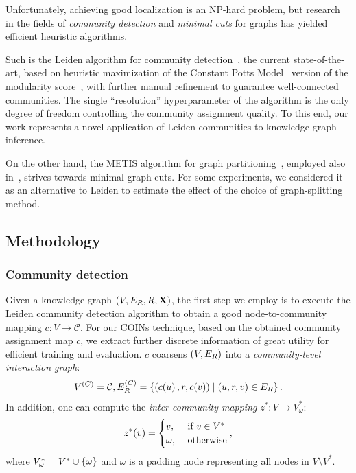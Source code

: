 Unfortunately, achieving good localization is an NP-hard problem, but research in the fields of \emph{community detection} and \emph{minimal cuts} for graphs has yielded efficient heuristic algorithms. 

Such is the Leiden algorithm for community detection~\cite{traag_louvain_2019}, the current state-of-the-art, based on heuristic maximization of the Constant Potts Model~\cite{traag_narrow_2011} version of the modularity score~\cite{blondel_fast_2008}, with further manual refinement to guarantee well-connected communities. The single \enquote{resolution} hyperparameter of the algorithm is the only degree of freedom controlling the community assignment quality. To this end, our work represents a novel application of Leiden communities to knowledge graph inference. 

On the other hand, the METIS algorithm for graph partitioning~\cite{karypis_fast_1998}, employed also in~\cite{zheng_dgl-ke_2020}, strives towards minimal graph cuts. For some experiments, we considered it as an alternative to Leiden to estimate the effect of the choice of graph-splitting method.

\subsection{Methodology}
\label{sec:methodology}

\subsubsection{Community detection}

Given a knowledge graph $\mathopen{}\left(V, E_R, R, \mathbf{X}\right)$, the first step we employ is to execute the Leiden community detection algorithm to obtain a good node-to-community mapping $c: V \to \mathcal{C}$. For our COINs technique, based on the obtained community assignment map $c$, we extract further discrete information of great utility for efficient training and evaluation. $c$ coarsens $\mathopen{}\left(V, E_R\right)$ into a \emph{community-level interaction graph}: 
\begin{equation}
V^{\mathopen{}\left(C\right)} = \mathcal{C}, E^{\mathopen{}\left(C\right)}_R = \mathopen{}\left\{\mathopen{}\left(c\mathopen{}\left(u\right),r,c\mathopen{}\left(v\right)\right) \mid \mathopen{}\left(u,r,v\right) \in E_R\right\}.    
\end{equation}
In addition, one can compute the \emph{inter-community mapping} $z^*: V \to V_{\omega}^*$:
\begin{equation}
    z^*\mathopen{}\left(v\right)=\begin{cases} v, & \text{ if } v \in V^* \\ \omega, & \text{ otherwise} \end{cases},
\end{equation}
where $V_{\omega}^* = V^* \cup \mathopen{}\left\{\omega\right\}$ and $\omega$ is a padding node representing all nodes in $V \setminus V^*$.

